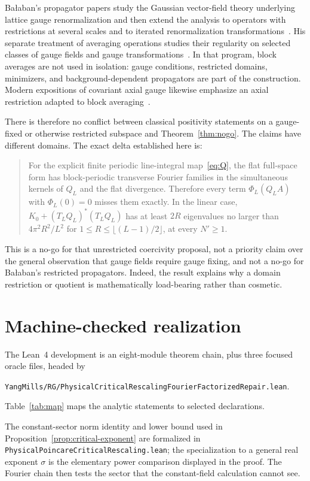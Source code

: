 \documentclass[11pt]{article}
\theoremstyle{definition}
\newcommand{\codepath}[1]{\nolinkurl{#1}}
\begin{document}
Ba\l aban's propagator papers study the Gaussian vector-field theory underlying
lattice gauge renormalization and then extend the analysis to operators with
restrictions at several scales and to iterated renormalization
transformations~\cite{BalabanI,BalabanII}.  His separate treatment of averaging
operations studies their regularity on selected classes of gauge fields and
gauge transformations~\cite{BalabanAveraging}.  In that program, block
averages are not used in isolation: gauge conditions, restricted domains,
minimizers, and background-dependent propagators are part of the construction.
Modern expositions of covariant axial gauge likewise emphasize an axial
restriction adapted to block averaging~\cite{DimockAxial}.

There is therefore no conflict between classical positivity statements on a
gauge-fixed or otherwise restricted subspace and Theorem~\ref{thm:nogo}.  The
claims have different domains.  The exact delta established here is:
\begin{quote}
For the explicit finite periodic line-integral map~\eqref{eq:Q}, the flat
full-space form has block-periodic transverse Fourier families in the
simultaneous kernels of $Q_L$ and the flat divergence.  Therefore every term
$\Phi_L(Q_LA)$ with $\Phi_L(0)=0$ misses them exactly.  In the linear case,
$K_0+(T_LQ_L)^*(T_LQ_L)$ has at least $2R$ eigenvalues no larger than
$4\pi^2R^2/L^2$ for $1\le R\le\lfloor(L-1)/2\rfloor$, at every $N'\ge1$.
\end{quote}
This is a no-go for that unrestricted coercivity proposal, not a priority
claim over the general observation that gauge fields require gauge fixing,
and not a no-go for Ba\l aban's restricted propagators.  Indeed, the result
explains why a domain restriction or quotient is mathematically load-bearing
rather than cosmetic.

\section{Machine-checked realization}

The Lean~4 development is an eight-module theorem chain, plus three focused
oracle files, headed by
\begin{center}
\codepath{YangMills/RG/PhysicalCriticalRescalingFourierFactorizedRepair.lean}.
\end{center}
Table~\ref{tab:map} maps the analytic statements to selected declarations.

The constant-sector norm identity and lower bound used in
Proposition~\ref{prop:critical-exponent} are formalized in
\codepath{PhysicalPoincareCriticalRescaling.lean}; the specialization to a
general real exponent $\sigma$ is the elementary power comparison displayed
in the proof.  The Fourier chain then tests the sector that the constant-field
calculation cannot see.
\end{document}
